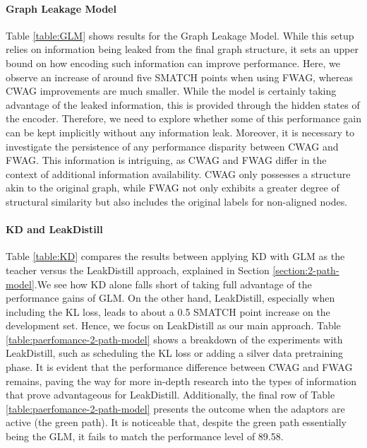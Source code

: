 \documentclass[11pt]{article}
\begin{document}
\paragraph{Graph Leakage Model} Table \ref{table:GLM} shows results for the Graph Leakage Model. While this setup relies on information being leaked from the final graph structure, it sets an upper bound on how encoding such information can improve performance. Here, we observe an increase of around five SMATCH points when using FWAG, whereas CWAG improvements are much smaller. While the model is certainly taking advantage of the leaked information, this is provided through the hidden states of the encoder. Therefore, we need to explore whether some of this performance gain can be kept implicitly without any information leak. Moreover, it is necessary to investigate the persistence of any performance disparity between CWAG and FWAG. This information is intriguing, as CWAG and FWAG differ in the context of additional information availability. CWAG only possesses a structure akin to the original graph, while FWAG not only exhibits a greater degree of structural similarity but also includes the original labels for non-aligned nodes. 





\paragraph{KD and LeakDistill} Table \ref{table:KD} compares the results between applying KD with GLM as the teacher versus the LeakDistill approach, explained in Section \ref{section:2-path-model}.We see how KD alone falls short of taking full advantage of the performance gains of GLM. On the other hand, LeakDistill, especially when including the KL loss, leads to about a 0.5 SMATCH point increase on the development set. Hence, we focus on LeakDistill as our main approach. Table \ref{table:paerfomance-2-path-model} shows a breakdown of the experiments with LeakDistill, such as scheduling the KL loss or adding a silver data pretraining phase. It is evident that the performance difference between CWAG and FWAG remains, paving the way for more in-depth research into the types of information that prove advantageous for LeakDistill.
Additionally, the final row of Table \ref{table:paerfomance-2-path-model} presents the outcome when the adaptors are active (the green path). It is noticeable that, despite the green path essentially being the GLM, it fails to match the performance level of 89.58.
\end{document}
